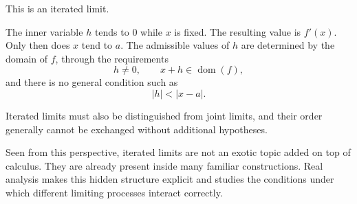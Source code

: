 \documentclass{essay}
\begin{document}
This is an iterated limit.

The inner variable \(h\) tends to \(0\) while \(x\) is fixed. The resulting value is \(f'(x)\). Only then does \(x\) tend to \(a\). The admissible values of \(h\) are determined by the domain of \(f\), through the requirements
\[ h\neq0, \qquad x+h\in\operatorname{dom}(f), \]
and there is no general condition such as
\[ |h|<|x-a|. \]

Iterated limits must also be distinguished from joint limits, and their order generally cannot be exchanged without additional hypotheses.

Seen from this perspective, iterated limits are not an exotic topic added on top of calculus. They are already present inside many familiar constructions. Real analysis makes this hidden structure explicit and studies the conditions under which different limiting processes interact correctly.
\end{document}
